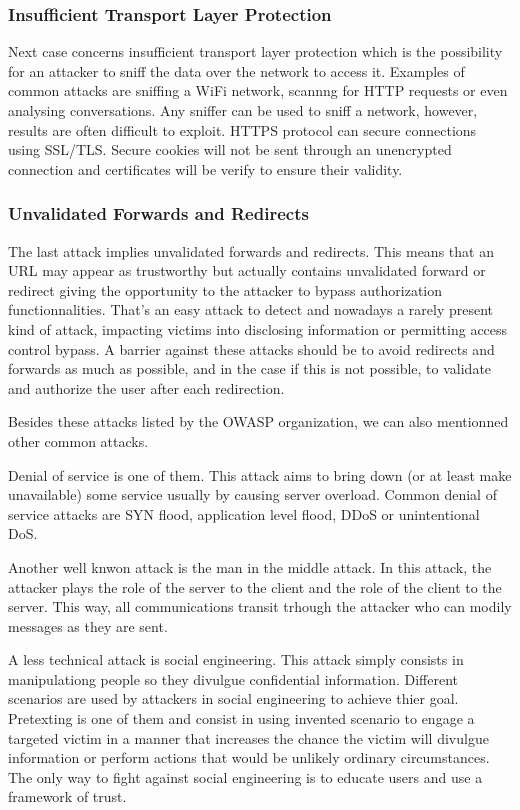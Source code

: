 \subsubsection{Insufficient Transport Layer Protection}
Next case concerns insufficient transport layer protection which is the
possibility for an attacker to sniff the data over the network to access it.
Examples of common attacks are sniffing a WiFi network, scannng for HTTP
requests or even analysing conversations. Any sniffer can be used to sniff a
network, however, results are often difficult to exploit. HTTPS protocol can
secure connections using SSL/TLS. Secure cookies will not be sent through an
unencrypted connection and certificates will be verify to ensure their
validity.

\subsubsection{Unvalidated Forwards and Redirects}
The last attack implies unvalidated forwards and redirects. This means that an
URL may appear as trustworthy but actually contains unvalidated forward or
redirect giving the opportunity to the attacker to bypass authorization
functionnalities. That's an easy attack to detect and nowadays a rarely
present kind of attack, impacting victims  into disclosing information or
permitting access control bypass. A barrier against these attacks should be to
avoid redirects and forwards as much as possible, and in the case if this is
not possible, to validate and authorize the user after each redirection.

Besides these attacks listed by the OWASP organization, we can also mentionned
other common attacks.

Denial of service is one of them. This attack aims to bring down (or at least
make unavailable) some service usually by causing server overload. Common
denial of service attacks are SYN flood, application level flood, DDoS or
unintentional DoS.

Another well knwon attack is the man in the middle attack. In this attack, the
attacker plays the role of the server to the client and the role of the client
to the server. This way, all communications transit trhough the attacker who
can modily messages as they are sent.

A less technical attack is social engineering. This attack simply consists in
manipulationg people so they divulgue confidential information. Different
scenarios are used by attackers in social engineering to achieve thier goal.
Pretexting is one of them and consist in using invented scenario to engage a
targeted victim in a manner that increases the chance the victim will divulgue
information or perform actions that would be unlikely ordinary circumstances.
The only way to fight against social engineering is to educate users and use a
framework of trust.

